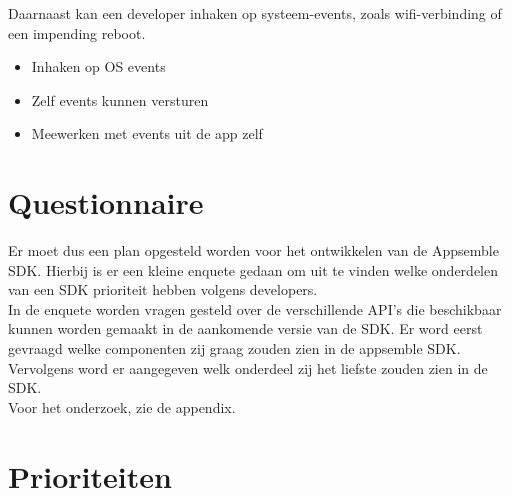 Daarnaast kan een developer inhaken op systeem-events, zoals wifi-verbinding of een impending reboot. 
\begin{itemize}
	\item Inhaken op OS events
	\item Zelf events kunnen versturen
	\item Meewerken met events uit de app zelf
\end{itemize}

\section{Questionnaire}

Er moet dus een plan opgesteld worden voor het ontwikkelen van de Appsemble SDK. Hierbij is er een kleine enquete gedaan om uit te vinden welke onderdelen van een SDK prioriteit hebben volgens developers. \\

In de enquete worden vragen gesteld over de verschillende API's die beschikbaar kunnen worden gemaakt in de aankomende versie van de SDK. Er word eerst gevraagd welke componenten zij graag zouden zien in de appsemble SDK. Vervolgens word er aangegeven welk onderdeel zij het liefste zouden zien in de SDK. \\

Voor het onderzoek, zie de appendix.

\section{Prioriteiten}
